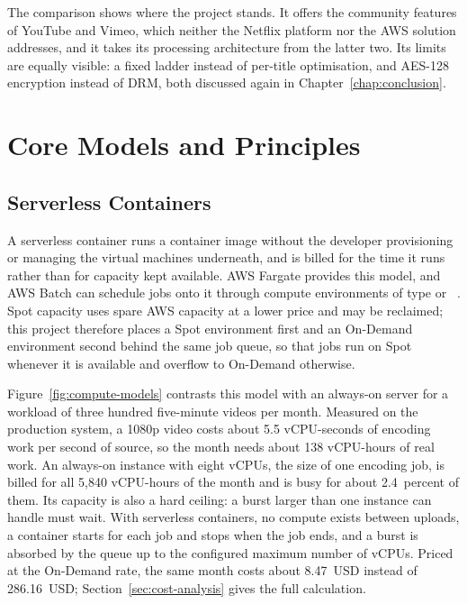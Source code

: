 The comparison shows where the project stands. It offers the community features of YouTube and
Vimeo, which neither the Netflix platform nor the AWS solution addresses, and it takes its processing
architecture from the latter two. Its limits are equally visible: a fixed ladder instead of
per-title optimisation, and AES-128 encryption instead of DRM, both discussed again in
Chapter~\ref{chap:conclusion}.

\section{Core Models and Principles}
\label{sec:core-models}

\subsection{Serverless Containers}
\label{sec:serverless-containers}

A serverless container runs a container image without the developer provisioning or managing the
virtual machines underneath, and is billed for the time it runs rather than for capacity kept
available. AWS Fargate provides this model, and AWS Batch can schedule jobs onto it through compute
environments of type  or ~\cite{awsbatchfargate}. Spot
capacity uses spare AWS capacity at a lower price and may be reclaimed; this project therefore
places a Spot environment first and an On-Demand environment second behind the same job queue, so
that jobs run on Spot whenever it is available and overflow to On-Demand otherwise.

Figure~\ref{fig:compute-models} contrasts this model with an always-on server for a workload of
three hundred five-minute videos per month. Measured on the production system, a 1080p video costs
about 5.5 vCPU-seconds of encoding work per second of source, so the month needs about 138
vCPU-hours of real work. An always-on instance with eight vCPUs, the size of one encoding job, is
billed for all 5,840 vCPU-hours of the month and is busy for about 2.4~percent of them. Its capacity
is also a hard ceiling: a burst larger than one instance can handle must wait. With serverless
containers, no compute exists between uploads, a container starts for each job and stops when the
job ends, and a burst is absorbed by the queue up to the configured maximum number of vCPUs. Priced
at the On-Demand rate, the same month costs about 8.47~USD instead of 286.16~USD;
Section~\ref{sec:cost-analysis} gives the full calculation.

